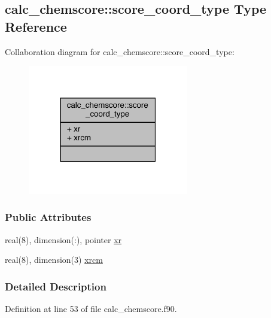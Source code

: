 \hypertarget{structcalc__chemscore_1_1score__coord__type}{\subsection{calc\-\_\-chemscore\-:\-:score\-\_\-coord\-\_\-type Type Reference}
\label{structcalc__chemscore_1_1score__coord__type}
}


Collaboration diagram for calc\-\_\-chemscore\-:\-:score\-\_\-coord\-\_\-type\-:
\nopagebreak
\begin{figure}[H]
\begin{center}
\leavevmode
\includegraphics[width=199pt]{structcalc__chemscore_1_1score__coord__type__coll__graph}
\end{center}
\end{figure}
\subsubsection*{Public Attributes}
\begin{DoxyCompactItemize}
\item 
real(8), dimension(\-:), pointer \hyperlink{structcalc__chemscore_1_1score__coord__type_abba8f44e4bea4ac623e9c1ab271a6ded}{xr}
\item 
real(8), dimension(3) \hyperlink{structcalc__chemscore_1_1score__coord__type_ae917506bef9aa4646094824d5c5a606b}{xrcm}
\end{DoxyCompactItemize}


\subsubsection{Detailed Description}


Definition at line 53 of file calc\-\_\-chemscore.\-f90.




